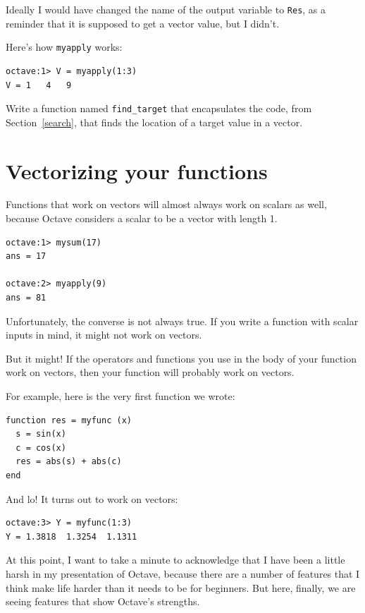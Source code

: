 \documentclass{book}
\begin{document}
Ideally I would have changed the name of the output variable to
{\tt Res}, as a reminder that it is supposed to get a vector value,
but I didn't.

Here's how {\tt myapply} works:

\begin{verbatim}
octave:1> V = myapply(1:3)
V = 1   4   9
\end{verbatim}

\begin{ex}
Write a function named {\tt find\_target} that
encapsulates the code, from Section~\ref{search}, that finds the
location of a target value in a vector.
\end{ex}


\section{Vectorizing your functions}

Functions that work on vectors will almost always work on scalars
as well, because Octave considers a scalar to be a vector with
length 1.

\begin{verbatim}
octave:1> mysum(17)
ans = 17

octave:2> myapply(9)
ans = 81
\end{verbatim}

Unfortunately, the converse is not always true. If you write
a function with scalar inputs in mind, it might not work on vectors.

But it might! If the operators and functions
you use in the body of your function work on vectors, then your
function will probably work on vectors.

For example, here is the very first function we wrote:

\begin{verbatim}
function res = myfunc (x)
  s = sin(x)
  c = cos(x)
  res = abs(s) + abs(c)
end
\end{verbatim}

And lo! It turns out to work on vectors:

\begin{verbatim}
octave:3> Y = myfunc(1:3)
Y = 1.3818  1.3254  1.1311
\end{verbatim}

At this point, I want to take a minute to acknowledge that I
have been a little harsh in my presentation of Octave, because
there are a number of features that I think make life harder
than it needs to be for beginners. But here, finally,
we are seeing features that show Octave's strengths.
\end{document}
